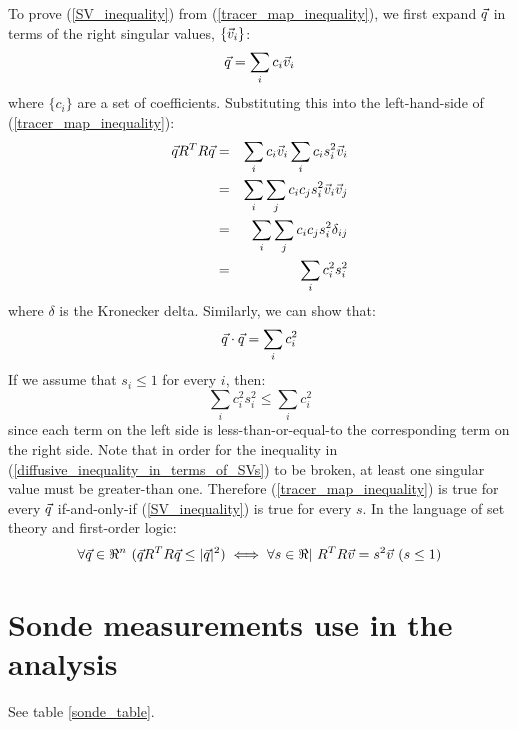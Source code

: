 \documentclass{article}
\begin{document}
To prove (\ref{SV_inequality}) from (\ref{tracer_map_inequality}), we first
expand $\vec q$ in terms of the right singular values, 
$\lbrace \vec v_i \rbrace$:
\begin{equation}
	\vec q = \sum_i c_i \vec v_i
\end{equation}
where $\lbrace c_i \rbrace$ are a set of coefficients.
Substituting this into the left-hand-side of (\ref{tracer_map_inequality}):
\begin{eqnarray}
	\vec q R^T R \vec q & = & \sum_i c_i \vec v_i \sum_i c_i s_i^2 \vec v_i \\
   & = & \sum_i \sum_j c_i c_j s_i^2 \vec v_i \vec v_j \\
   & = & \sum_i \sum_j c_i c_j s_i^2 \delta_{ij} \\
	  & = & \sum_i c_i^2 s_i^2
\end{eqnarray}
where $\delta$ is the Kronecker delta.
Similarly, we can show that:
\begin{equation}
	\vec q \cdot \vec q = \sum_i c_i^2
\end{equation}
If we assume that $s_i \le 1$ for every $i$, then:
\begin{equation}
	\sum_i c_i^2 s_i^2 \le \sum_i c_i^2 
	\label{diffusive_inequality_in_terms_of_SVs}
\end{equation}
since each term on the left side is less-than-or-equal-to the
corresponding term on the right side. 
Note that in order for the inequality in 
(\ref{diffusive_inequality_in_terms_of_SVs}) to be broken, at least one
singular value must be greater-than one.
Therefore (\ref{tracer_map_inequality}) is true for every $\vec q$
if-and-only-if (\ref{SV_inequality}) is true for every $s$.
In the language of set theory and first-order logic:
\begin{equation}
	\forall \vec q \in \Re^n ~ (\vec q R^T R \vec q \le |\vec q |^2) \iff \forall s \in \Re | ~R^T R \vec v = s^2 \vec v ~ (s \le 1)
\end{equation}

\section{Sonde measurements use in the analysis}

\begin{table}
  
  \label{sonde_table}
\end{table}

See table \ref{sonde_table}.
\end{document}
